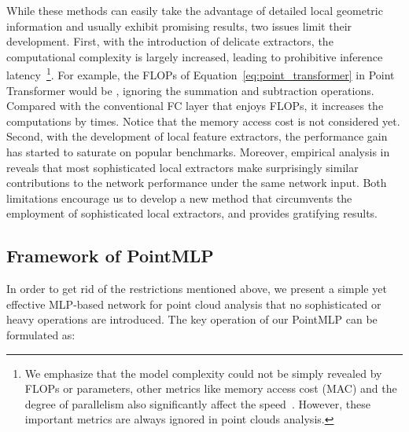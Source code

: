 \documentclass{article} \usepackage{iclr2022_conference,times}
\begin{document}
While these methods can easily take the advantage of detailed local geometric information and usually exhibit promising results, two issues limit their development. First, with the introduction of delicate extractors, the computational complexity is largely increased, leading to prohibitive inference latency~\footnote{We emphasize that the model complexity could not be simply revealed by FLOPs or parameters, other metrics like memory access cost (MAC) and the degree of parallelism also significantly affect the speed~\citep{ma2018shufflenet, zhang2020resnest}. However, these important metrics are always ignored in point clouds analysis.}. 
For example, the FLOPs of Equation~\ref{eq:point_transformer} in Point Transformer would be , ignoring the summation and subtraction operations. Compared with the conventional FC layer that enjoys  FLOPs, it increases the computations by times. Notice that the memory access cost is not considered yet.
Second, with the development of local feature extractors, the performance gain has started to saturate on popular benchmarks. Moreover, empirical analysis in ~\citet{liu2020closer} reveals that most sophisticated local extractors make surprisingly similar contributions to the network performance under the same network input.
Both limitations encourage us to develop a new method that circumvents the employment of sophisticated local extractors, and provides gratifying results.







\subsection{Framework of PointMLP}
In order to get rid of the restrictions mentioned above, we present a simple yet effective MLP-based network for point cloud analysis that no sophisticated or heavy operations are introduced. The key operation of our PointMLP can be formulated as:
\end{document}
